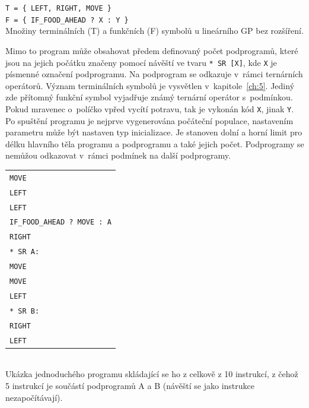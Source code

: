 \vspace{0.3cm}
\begin{center}
    \texttt{T = \{ LEFT, RIGHT, MOVE \}} \\
    \texttt{F = \{ IF\_FOOD\_AHEAD ? X : Y \}}\\[0.1cm]
    {\small Množiny terminálních (T) a funkčních (F) symbolů u lineárního GP bez rozšíření.}
\end{center}
\vspace{0.3cm}

\noindent Mimo to program může obsahovat předem definovaný počet podprogramů, které jsou na jejich počátku značeny pomocí návěští ve tvaru \texttt{* SR [X]}, kde \texttt{X} je písmenné označení podprogramu. Na podprogram se odkazuje v~rámci ternárních operátorů. Význam terminálních symbolů je vysvětlen v~kapitole~\ref{ch:5}. Jediný zde přítomný funkční symbol vyjadřuje známý ternární operátor s~podmínkou. Pokud mravenec o~políčko vpřed vycítí potravu, tak je vykonán kód \texttt{X}, jinak \texttt{Y}. Po spuštění programu je nejprve vygenerována počáteční populace, nastavením parametru může být nastaven typ inicializace. Je stanoven dolní a horní limit pro délku hlavního těla programu a podprogramu a také jejich počet. Podprogramy se nemůžou odkazovat v~rámci podmínek na další podprogramy.

\vspace{0.5cm}
 \begin{center}
  \begin{tabular}{l}
   \texttt{MOVE} \\
    \texttt{LEFT}\\
    \texttt{LEFT}\\
    \texttt{IF\_FOOD\_AHEAD ? MOVE : A}\\
    \texttt{RIGHT}\\
    \texttt{* SR A:}\\
    \texttt{MOVE}\\
    \texttt{MOVE}\\
    \texttt{LEFT}\\
    \texttt{* SR B:}\\
    \texttt{RIGHT}\\
    \texttt{LEFT}\\
  \end{tabular}\\
\vspace{0.3cm}
Ukázka jednoduchého programu skládající se ho z celkově z 10 instrukcí, z čehož 5 instrukcí je součástí podprogramů A a B (návěští se jako instrukce nezapočítávají).
\end{center} 
\vspace{0.5cm}

